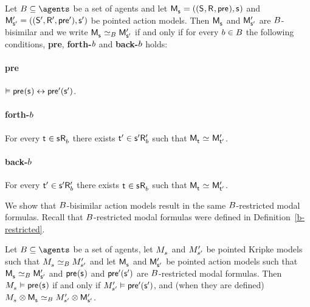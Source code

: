 \begin{definition}
Let $\agentsB \subseteq \agents$ be a set of agents and let $\aPModelAndTuple{\aStateS}$ and $\aPModelAndTupleP{\aStateSP}$ be pointed action models.
Then $\aPModel{\aStateS}$ and ${\mathsf{M}^{\prime}_{{\mathsf{{s}}^{\prime}}}}$ are $B$-bisimilar and we write $\aPModel{\aStateS} \bisimilar[\agentsB] \aPModelP{\aStateSP}$ if and only if for every $b \in B$ the following conditions, {\bf pre}, {\bf forth-$b$} and {\bf back-$b$} holds:

\paragraph{pre}
$\entails \aPrecondition(\aStateS) \iff \aPreconditionP(\aStateSP)$.

\paragraph{forth-$b$}
For every $\aStateT \in \aSuccessorsB{\aStateS}$ there exists ${\mathsf{{t}}^{\prime}} \in {{\mathsf{{s}}^{\prime}}} {\mathsf{R}^{\prime}_{b}}$ such that $\aPModel{\aStateT} \bisimilar \aPModelP{\aStateTP}$.

\paragraph{back-$b$}
For every ${\mathsf{{t}}^{\prime}} \in {{\mathsf{{s}}^{\prime}}} {\mathsf{R}^{\prime}_{b}}$ there exists $\aStateT \in \aSuccessorsB{\aStateS}$ such that $\aPModel{\aStateT} \bisimilar \aPModelP{\aStateTP}$.
\end{definition}

We show that $B$-bisimilar action models result in the same $B$-restricted modal formulas.
Recall that $B$-restricted modal formulas were defined in Definition~\ref{b-restricted}.

\begin{lemma}\label{action-b-bisimulation-results}
Let $\agentsB \subseteq \agents$ be a set of agents, let $\kPModel{\kStateS}$ and ${M^{\prime}_{{s}^{\prime}}}$ be pointed Kripke models such that $\kPModel{\kStateS} \bisimilar[\agentsB] \kPModelP{\kStateSP}$ and let $\aPModel{\aStateS}$ and ${\mathsf{M}^{\prime}_{{\mathsf{{s}}^{\prime}}}}$ be pointed action models such that $\aPModel{\aStateS} \bisimilar[\agentsB] \aPModelP{\aStateSP}$ and $\aPrecondition(\aStateS)$ and ${\mathsf{pre}^{\prime}}({\mathsf{{s}}^{\prime}})$ are $B$-restricted modal formulas.
Then $\kPModel{\kStateS} \entails \aPrecondition(\aStateS)$ if and only if ${M^{\prime}_{{s}^{\prime}}} \vDash {\mathsf{pre}^{\prime}}({\mathsf{{s}}^{\prime}})$, and (when they are defined) $\kPModel{\kStateS} \exec \aPModel{\aStateS} \bisimilar[\agentsB] \kPModelP{\kStateSP} \exec \aPModelP{\aStateSP}$.
\end{lemma}

